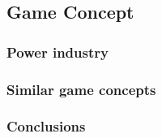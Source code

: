 \subsection{Game Concept}

\subsubsection{Power industry}

\subsubsection{Similar game concepts}


\subsubsection{Conclusions}